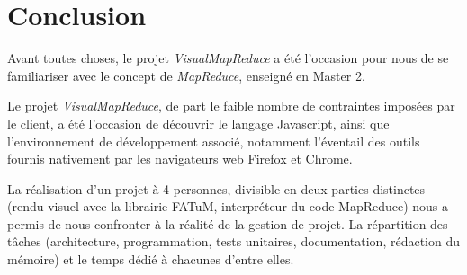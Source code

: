 \chapter*{Conclusion}

Avant toutes choses, le projet \textit{VisualMapReduce} a été l'occasion pour nous de se familiariser avec le concept de \textit{MapReduce}, enseigné en Master 2.

Le projet \textit{VisualMapReduce}, de part le faible nombre de contraintes imposées par le client, a été l'occasion de découvrir le langage Javascript, ainsi que l'environnement de développement associé, notamment l'éventail des outils fournis nativement par les navigateurs web Firefox et Chrome.

La réalisation d'un projet à 4 personnes, divisible en deux parties distinctes (rendu visuel avec la librairie FATuM, interpréteur du code MapReduce) nous a permis de nous confronter à la réalité de la gestion de projet. La répartition des tâches (architecture, programmation, tests unitaires, documentation, rédaction du mémoire) et le temps dédié à chacunes d'entre elles.


